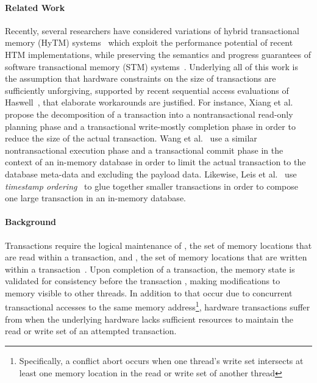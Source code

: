\paragraph{Related Work}
Recently, several researchers have considered variations 
of hybrid transactional memory (HyTM) 
systems~\cite{DamronFeLe06,DalessandroSpSc10,MatveevSh15}
which exploit the performance potential of recent HTM
implementations, while preserving the semantics and
progress guarantees of software transactional memory (STM)
systems~\cite{ShavitTo95}.  Underlying
all of this work is the assumption that hardware constraints
on the size of transactions are sufficiently unforgiving, supported
by recent sequential access evaluations of Haswell~\cite{RitsonBa13,GoelTiNe14,PereiraGaAm14,DieguesRoRo14},
that elaborate workarounds are justified.  For instance, Xiang et 
al.~\cite{XiangSc15,XiangSc13} propose the decomposition of
a transaction into a nontransactional read-only 
planning phase and a transactional write-mostly 
completion phase in order to reduce the size of the
actual transaction.  Wang et al.~\cite{WangQiLi14} 
use a similar nontransactional execution phase
and a transactional commit phase in the context
of an in-memory database in order to limit the
actual transaction to the database meta-data and 
excluding the payload data.
Likewise, Leis et al.~\cite{LeisKeNe14}
use \emph{timestamp ordering}~\cite{Carey83} to glue together
smaller transactions in order to compose one large
transaction in an in-memory database.  

\paragraph{Background}
Transactions require the logical 
maintenance of , the set
of memory locations that are read within a 
transaction, and , the set
of memory locations that are written within 
a transaction~\cite{HerlihyMo93}. Upon 
completion of a transaction, the memory state is validated for 
consistency before the transaction
, making modifications to memory 
visible to other threads.  In addition to 
that occur due to concurrent transactional accesses
to the same memory address\footnote{Specifically,
a conflict abort occurs when one thread's write set 
intersects at least one memory location in the 
read or write set of another thread}, hardware transactions suffer 
from  when the underlying hardware
lacks sufficient resources to maintain the
read or write set of an attempted transaction.

